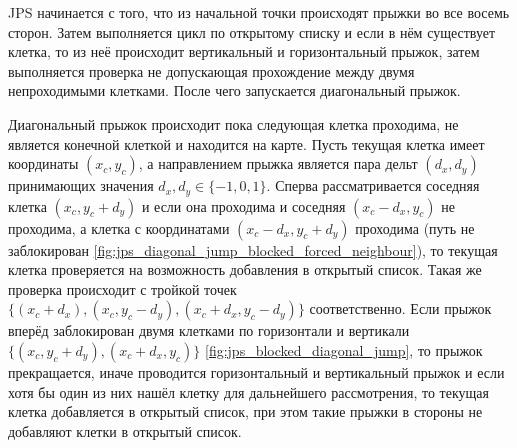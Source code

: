 JPS начинается с того, что из начальной точки происходят прыжки во все восемь сторон. Затем выполняется цикл по открытому списку и если в нём существует клетка, то из неё происходит вертикальный и горизонтальный прыжок, затем выполняется проверка не допускающая прохождение между двумя непроходимыми клетками. После чего запускается диагональный прыжок. 

Диагональный прыжок происходит пока следующая клетка проходима, не является конечной клеткой и находится на карте. Пусть текущая клетка имеет координаты ${(x_c, y_c)}$, а направлением прыжка является пара дельт ${(d_x, d_y)}$ принимающих значения ${d_x, d_y \in \{-1, 0, 1\}}$. Сперва рассматривается соседняя клетка ${(x_c, y_c+d_y)}$ и если она проходима и соседняя  ${(x_c-d_x, y_c)}$ не проходима, а клетка с координатами ${(x_c-d_x, y_c+d_y)}$ проходима (путь не заблокирован \cref{fig:jps_diagonal_jump_blocked_forced_neighbour}), то текущая клетка проверяется на возможность добавления в открытый список. Такая же проверка происходит с тройкой точек ${\{(x_c+d_x), (x_c, y_c-d_y), (x_c+d_x, y_c-d_y)\}}$ соответственно. Если прыжок вперёд заблокирован двумя клетками по горизонтали и вертикали ${\{(x_c, y_c+d_y), (x_c+d_x, y_c)\}}$ \cref{fig:jps_blocked_diagonal_jump}, то прыжок прекращается, иначе проводится горизонтальный и вертикальный прыжок и если хотя бы один из них нашёл клетку для дальнейшего рассмотрения, то текущая клетка добавляется в открытый список, при этом такие прыжки в стороны не добавляют клетки в открытый список.
  
{
	\mybox[x=1,y=1,color=grey]
	\mybox[x=1,y=2,color=grey]
	\mybox[x=1,y=3,color=grey]
	\mybox[x=2,y=1,color=black]
	\mybox[x=3,y=2,color=black]
	\mybox[x=3,y=1,color=yellow]
	\mybox[x=2,y=2,color=green]
	
	\mygrid[width=5, height=5]
	
	\myarrow[startx=0,starty=0,endx=1,endy=1,color=darkgrey]
	\myarrow[startx=1,starty=1,endx=1,endy=2,color=darkgrey]
	\myarrow[startx=1,starty=2,endx=1,endy=3,color=darkgrey]
	\myarrow[startx=2,starty=2,endx=2,endy=3,color=blue]
	\myarrow[startx=1,starty=1,endx=2,endy=2,color=darkgrey]
	\myarrow[startx=2,starty=2,endx=3,endy=2,color=red]
	\myarrow[startx=2,starty=2,endx=3,endy=1,color=red]
	\myarrow[startx=2,starty=2,endx=3,endy=3,color=blue]
}
  
